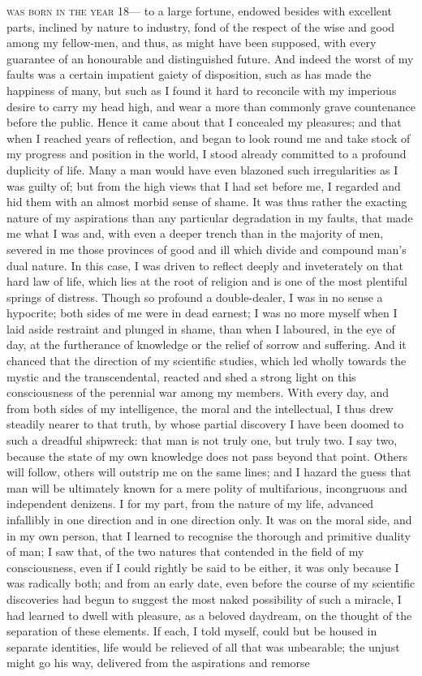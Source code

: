 \documentclass[]{novel}
\begin{document}
 \textsc{was born in the year} 18— to a large fortune, endowed besides with excellent parts, inclined by nature to industry, fond of the respect of the wise and good among my fellow-men, and thus, as might have been supposed, with every guarantee of an honourable and distinguished future. And indeed the worst of my faults was a certain impatient gaiety of disposition, such as has made the happiness of many, but such as I found it hard to reconcile with my imperious desire to carry my head high, and wear a more than commonly grave countenance before the public. Hence it came about that I concealed my pleasures; and that when I reached years of reflection, and began to look round me and take stock of my progress and position in the world, I stood already committed to a profound duplicity of life. Many a man would have even blazoned such irregularities as I was guilty of; but from the high views that I had set before me, I regarded and hid them with an almost morbid sense of shame. It was thus rather the exacting nature of my aspirations than any particular degradation in my faults, that made me what I was and, with even a deeper trench than in the majority of men, severed in me those provinces of good and ill which divide and compound man's dual nature. In this case, I was driven to reflect deeply and inveterately on that hard law of life, which lies at the root of religion and is one of the most plentiful springs of distress. Though so profound a double-dealer, I was in no sense a hypocrite; both sides of me were in dead earnest; I was no more myself when I laid aside restraint and plunged in shame, than when I laboured, in the eye of day, at the furtherance of knowledge or the relief of sorrow and suffering. And it chanced that the direction of my scientific studies, which led wholly towards the mystic and the transcendental, reacted and shed a strong light on this consciousness of the perennial war among my members. With every day, and from both sides of my intelligence, the moral and the intellectual, I thus drew steadily nearer to that truth, by whose partial discovery I have been doomed to such a dreadful shipwreck: that man is not truly one, but truly two. I say two, because the state of my own knowledge does not pass beyond that point. Others will follow, others will outstrip me on the same lines; and I hazard the guess that man will be ultimately known for a mere polity of multifarious, incongruous and independent denizens. I for my part, from the nature of my life, advanced infallibly in one direction and in one direction only. It was on the moral side, and in my own person, that I learned to recognise the thorough and primitive duality of man; I saw that, of the two natures that contended in the field of my consciousness, even if I could rightly be said to be either, it was only because I was radically both; and from an early date, even before the course of my scientific discoveries had begun to suggest the most naked possibility of such a miracle, I had learned to dwell with pleasure, as a beloved daydream, on the thought of the separation of these elements. If each, I told myself, could but be housed in separate identities, life would be relieved of all that was unbearable; the unjust might go his way, delivered from the aspirations and remorse 
\end{document}
